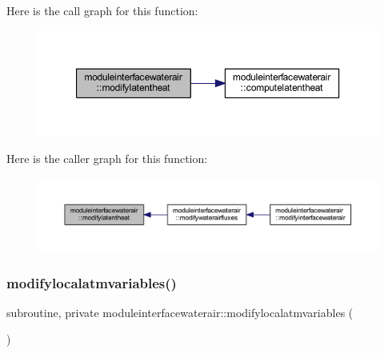 Here is the call graph for this function\+:\nopagebreak
\begin{figure}[H]
\begin{center}
\leavevmode
\includegraphics[width=350pt]{namespacemoduleinterfacewaterair_a75fdc03352ad6627e770e22eddc20f05_cgraph}
\end{center}
\end{figure}
Here is the caller graph for this function\+:\nopagebreak
\begin{figure}[H]
\begin{center}
\leavevmode
\includegraphics[width=350pt]{namespacemoduleinterfacewaterair_a75fdc03352ad6627e770e22eddc20f05_icgraph}
\end{center}
\end{figure}
\mbox{\label{namespacemoduleinterfacewaterair_a44a9529a1162816a090c836bc75d3f29}} 
\subsubsection{\texorpdfstring{modifylocalatmvariables()}{modifylocalatmvariables()}}
{\footnotesize\ttfamily subroutine, private moduleinterfacewaterair\+::modifylocalatmvariables (\begin{DoxyParamCaption}{ }\end{DoxyParamCaption})\hspace{0.3cm}{\ttfamily [private]}}

